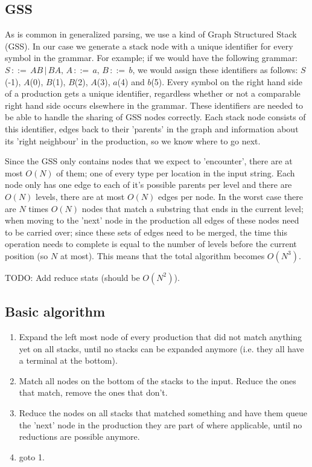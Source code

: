 \documentclass[a4paper,10pt]{article}
\begin{document}
\subsection{GSS}

As is common in generalized parsing, we use a kind of Graph Structured Stack (GSS). In our case we generate a stack node with a unique identifier for every symbol in the grammar. For example; if we would have the following grammar: $S\,::=\,AB\,|\,BA,\,A\,::=\,a,\,B\,::=\,b$, we would assign these identifiers as follows: $S$(-1), $A$(0), $B$(1), $B$(2), $A$(3), $a$(4) and $b$(5). Every symbol on the right hand side of a production gets a unique identifier, regardless whether or not a comparable right hand side occurs elsewhere in the grammar. These identifiers are needed to be able to handle the sharing of GSS nodes correctly. Each stack node consists of this identifier, edges back to their 'parents' in the graph and information about its 'right neighbour' in the production, so we know where to go next.

Since the GSS only contains nodes that we expect to 'encounter', there are at most $O(N)$ of them; one of every type per location in the input string. Each node only has one edge to each of it's possible parents per level and there are $O(N)$ levels, there are at most $O(N)$ edges per node.  In the worst case there are $N$ times $O(N)$ nodes that match a substring that ends in the current level; when moving to the 'next' node in the production all edges of these nodes need to be carried over; since these sets of edges need to be merged, the time this operation needs to complete is equal to the number of levels before the current position (so $N$ at most). This means that the total algorithm becomes $O(N^3)$.

TODO: Add reduce stats (should be $O(N^2)$).

\subsection{Basic algorithm}

\begin{enumerate}
 \setlength{\itemsep}{0pt}
 \setlength{\parskip}{0pt}
 \setlength{\parsep}{0pt}

 \item Expand the left most node of every production that did not match anything yet on all stacks, until no stacks can be expanded anymore (i.e. they all have a terminal at the bottom).
 \item Match all nodes on the bottom of the stacks to the input. Reduce the ones that match, remove the ones that don't.
 \item Reduce the nodes on all stacks that matched something and have them queue the 'next' node in the production they are part of where applicable, until no reductions are possible anymore.
 \item goto 1.
\end{enumerate}
\end{document}

